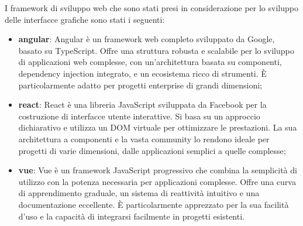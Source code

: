 I framework di sviluppo web che sono stati presi in considerazione per lo sviluppo delle interfacce grafiche sono stati i seguenti:
\begin{itemize}
    \item \textbf{\gls{angular}}: Angular è un framework web completo sviluppato da Google, basato su TypeScript. Offre una struttura robusta e scalabile per lo sviluppo di applicazioni web complesse, con un'architettura basata su componenti, dependency injection integrato, e un ecosistema ricco di strumenti. È particolarmente adatto per progetti enterprise di grandi dimensioni;
    \item \textbf{\gls{react}}: React è una libreria JavaScript sviluppata da Facebook per la costruzione di interfacce utente interattive. Si basa su un approccio dichiarativo e utilizza un DOM virtuale per ottimizzare le prestazioni. La sua architettura a componenti e la vasta community lo rendono ideale per progetti di varie dimensioni, dalle applicazioni semplici a quelle complesse;
    \item \textbf{\gls{vue}}: Vue è un framework JavaScript progressivo che combina la semplicità di utilizzo con la potenza necessaria per applicazioni complesse. Offre una curva di apprendimento graduale, un sistema di reattività intuitivo e una documentazione eccellente. È particolarmente apprezzato per la sua facilità d'uso e la capacità di integrarsi facilmente in progetti esistenti.
\end{itemize}

